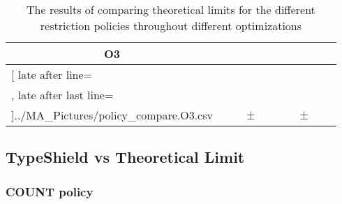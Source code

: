 \begin{table}[!htbp]
{\begin{tabular}{l|c|rcl|c|rcl|c}
\multicolumn{1}{c}{\bfseries O3}
	\\\midrule
	\csvreader[ late after line=\\, late after last line=\\\bottomrule]{../MA_Pictures/policy_compare.O3.csv}{
}
	{\csvcolii  &  \csvcoliii & \csvcolx & $\pm$ & \csvcolxi & \csvcolxii & \csvcolxix & $\pm$ & \csvcolxx& \csvcolxxi}%

    	\end{tabular}
}
		\caption {The results of comparing theoretical limits for the different restriction policies throughout different optimizations}
		\label{tbl:policycomp}
\end{table}


\subsection{TypeShield vs Theoretical Limit}
\label{subsection:typeshieldvslimit}


\subsubsection{COUNT policy}

